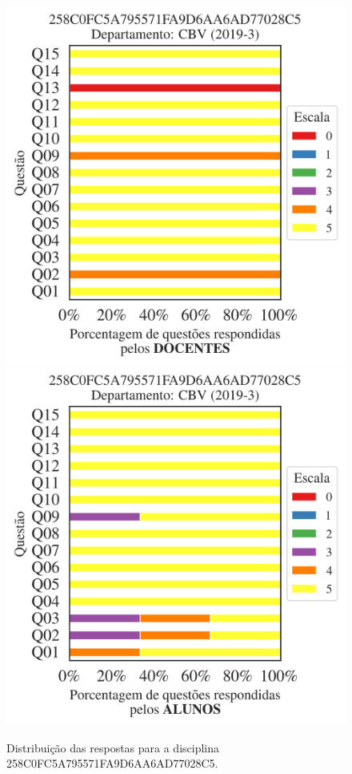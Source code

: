 \documentclass[a4paper,10pt]{article}
\begin{document}
\begin{figure}[h]
\centering
\includegraphics[width=0.485\linewidth]{analise_disciplina_departamento_CBV_258C0FC5A795571FA9D6AA6AD77028C5_docentes.png}
\includegraphics[width=0.485\linewidth]{analise_disciplina_departamento_CBV_258C0FC5A795571FA9D6AA6AD77028C5_alunos.png}
\caption{\label{fig:analise_geral_departamento}                Distribuição das respostas para a disciplina 258C0FC5A795571FA9D6AA6AD77028C5. }
\end{figure}
\end{document}
